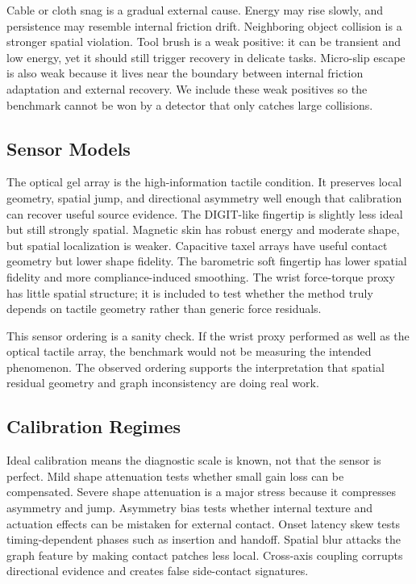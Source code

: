 \documentclass{article}
\begin{document}
Cable or cloth snag is a gradual external cause. Energy may rise slowly, and persistence may resemble internal friction drift. Neighboring object collision is a stronger spatial violation. Tool brush is a weak positive: it can be transient and low energy, yet it should still trigger recovery in delicate tasks. Micro-slip escape is also weak because it lives near the boundary between internal friction adaptation and external recovery. We include these weak positives so the benchmark cannot be won by a detector that only catches large collisions.

\subsection{Sensor Models}

The optical gel array is the high-information tactile condition. It preserves local geometry, spatial jump, and directional asymmetry well enough that calibration can recover useful source evidence. The DIGIT-like fingertip is slightly less ideal but still strongly spatial. Magnetic skin has robust energy and moderate shape, but spatial localization is weaker. Capacitive taxel arrays have useful contact geometry but lower shape fidelity. The barometric soft fingertip has lower spatial fidelity and more compliance-induced smoothing. The wrist force-torque proxy has little spatial structure; it is included to test whether the method truly depends on tactile geometry rather than generic force residuals.

This sensor ordering is a sanity check. If the wrist proxy performed as well as the optical tactile array, the benchmark would not be measuring the intended phenomenon. The observed ordering supports the interpretation that spatial residual geometry and graph inconsistency are doing real work.

\subsection{Calibration Regimes}

Ideal calibration means the diagnostic scale is known, not that the sensor is perfect. Mild shape attenuation tests whether small gain loss can be compensated. Severe shape attenuation is a major stress because it compresses asymmetry and jump. Asymmetry bias tests whether internal texture and actuation effects can be mistaken for external contact. Onset latency skew tests timing-dependent phases such as insertion and handoff. Spatial blur attacks the graph feature by making contact patches less local. Cross-axis coupling corrupts directional evidence and creates false side-contact signatures.
\end{document}
